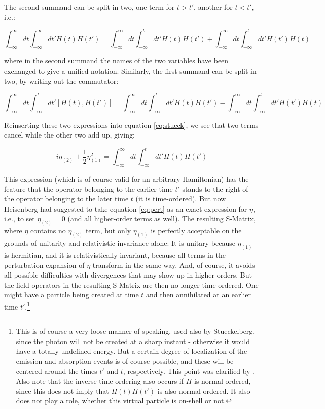 \documentclass[12pt]{article}
\begin{document}
The second summand can be split in two, one term for $t>t'$, another for $t<t'$, i.e.:

\begin{equation}
\int_{-\infty}^{\infty} dt \int_{-\infty}^{\infty} dt' H(t)  H(t') = \int_{-\infty}^{\infty} dt \int_{-\infty}^{t} dt' H(t)  H(t') + \int_{-\infty}^{\infty} dt \int_{-\infty}^{t} dt' H(t')  H(t)
\end{equation}

where in the second summand the names of the two variables have been exchanged to give a unified notation. Similarly, the first summand can be split in two, by writing out the commutator:

\begin{equation}
\int_{-\infty}^{\infty} dt \int_{-\infty}^{t} dt' \left[H(t), H(t') \right] = \int_{-\infty}^{\infty} dt \int_{-\infty}^{t} dt' H(t)  H(t') - \int_{-\infty}^{\infty} dt \int_{-\infty}^{t} dt' H(t')  H(t)
\end{equation}

Reinserting these two expressions into equation \ref{eq:stueck}, we see that two terms cancel while the other two add up, giving:

\begin{equation}
\label{eq:pertend}
i \eta_{(2)} + \frac{1}{2} \eta_{(1)}^2 =  \int_{-\infty}^{\infty} dt \int_{-\infty}^{t} dt' H(t)  H(t')
\end{equation}

This expression (which is of course valid for an arbitrary Hamiltonian) has the feature that the operator belonging to the earlier time $t'$ stands to the right of the operator belonging to the later time $t$ (it is time-ordered). But now Heisenberg had suggested to take equation \ref{eq:pert} as an exact expression for $\eta$, i.e., to set $\eta_{(2)} = 0$ (and all higher-order terms as well). The resulting S-Matrix, where $\eta$ contains no $\eta_{(2)}$ term, but only $\eta_{(1)}$ is perfectly acceptable on the grounds of unitarity and relativistic invariance alone: It is unitary because $\eta_{(1)}$ is hermitian, and it is relativistically invariant, because all terms in the perturbation expansion of $\eta$ transform in the same way. And, of course, it avoids all possible difficulties with divergences that may show up in higher orders. But the field operators in the resulting S-Matrix are then no longer time-ordered. One might have a particle being created at time $t$ and then annihilated at an earlier time $t'$.\footnote{This is of course a very loose manner of speaking, used also by Stueckelberg, since the photon will not be created at a sharp instant - otherwise it would have a totally undefined energy. But a certain degree of localization of the emission and absorption events is of course possible, and these will be centered around the times $t'$ and $t$, respectively. This point was clarified by \citet{fierz_1950_uber-die-bedeutung}. Also note that the inverse time ordering also occurs if $H$ is normal ordered, since this does not imply that $H(t) H(t')$ is also normal ordered. It also does not play a role, whether this virtual particle is on-shell or not.}
\end{document}
